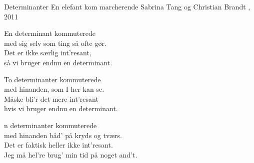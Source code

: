 \begin{song}{Determinanter}
  {} %
  {En elefant kom marcherende} %
  {Sabrina Tang og Christian Brandt} %
  {\TKET, 2011} %
  {\NotCCLIed} %

  \begin{SBVerse}
    En determinant kommuterede\\
    med sig selv som ting så ofte gør.\\
    Det er ikke særlig int’resant,\\
    så vi bruger endnu en determinant.
  \end{SBVerse}

  \begin{SBVerse}
    To determinanter kommuterede\\
    med hinanden, som I her kan se.\\
    Måske bli’r det mere int’resant\\
    hvis vi bruger endnu en determinant.
  \end{SBVerse}

  \begin{SBVerse}
    n determinanter kommuterede\\
    med hinanden båd’ på kryds og tværs.\\
    Det er faktisk heller ikke int’resant.\\
    Jeg må hel’re brug’ min tid på noget and’t.
  \end{SBVerse}
\end{song}